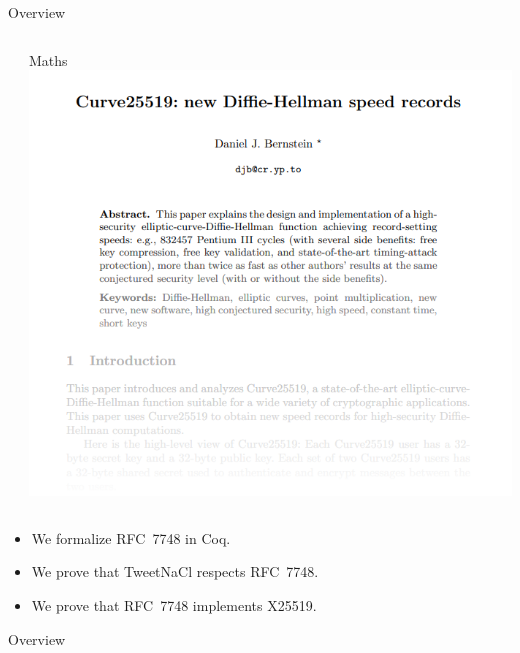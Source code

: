 \documentclass[8pt,aspectratio=169]{beamer}
\begin{document}
\begin{frame}{Overview}
\begin{columns}
\begin{column}[T]{0.3\textwidth}
		\end{column}
		\begin{column}[T]{0.3\textwidth}
			\vspace{0pt}%
			\centering
			\large{Maths}\\
			\vspace{0.2cm}
			\includegraphics[width=\textwidth]{curvePaperG.png}
		\end{column}
	\end{columns}
	\begin{center}
		\begin{itemize}
			\item We formalize RFC~7748 in Coq.
			\item We prove that TweetNaCl respects RFC~7748.
			\item We prove that RFC~7748 implements X25519.
		\end{itemize}
	\end{center}
\end{frame}

%
%
\begin{frame}{Overview}
	\vspace{-0.5cm}
	\centering
	
\end{frame}


\end{document}
